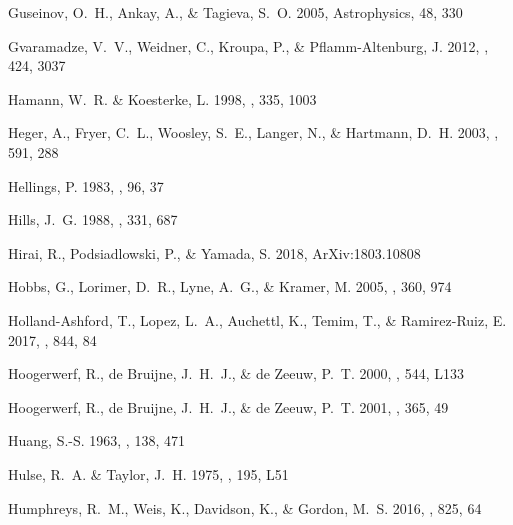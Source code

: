\documentclass{aa}
\begin{document}
\begin{thebibliography}{242}
{Guseinov}, O.~H., {Ankay}, A., \& {Tagieva}, S.~O. 2005, Astrophysics, 48, 330

{Gvaramadze}, V.~V., {Weidner}, C., {Kroupa}, P., \& {Pflamm-Altenburg}, J.
  2012, \mnras, 424, 3037

{Hamann}, W.~R. \& {Koesterke}, L. 1998, \aap, 335, 1003

{Heger}, A., {Fryer}, C.~L., {Woosley}, S.~E., {Langer}, N., \& {Hartmann},
  D.~H. 2003, \apj, 591, 288

{Hellings}, P. 1983, \apss, 96, 37

{Hills}, J.~G. 1988, \nat, 331, 687

{Hirai}, R., {Podsiadlowski}, P., \& {Yamada}, S. 2018, ArXiv:1803.10808

{Hobbs}, G., {Lorimer}, D.~R., {Lyne}, A.~G., \& {Kramer}, M. 2005, \mnras,
  360, 974

{Holland-Ashford}, T., {Lopez}, L.~A., {Auchettl}, K., {Temim}, T., \&
  {Ramirez-Ruiz}, E. 2017, \apj, 844, 84

{Hoogerwerf}, R., {de Bruijne}, J.~H.~J., \& {de Zeeuw}, P.~T. 2000, \apjl,
  544, L133

{Hoogerwerf}, R., {de Bruijne}, J.~H.~J., \& {de Zeeuw}, P.~T. 2001, \aap, 365,
  49

{Huang}, S.-S. 1963, \apj, 138, 471

{Hulse}, R.~A. \& {Taylor}, J.~H. 1975, \apjl, 195, L51

{Humphreys}, R.~M., {Weis}, K., {Davidson}, K., \& {Gordon}, M.~S. 2016, \apj,
  825, 64


\end{thebibliography}
\end{document}
